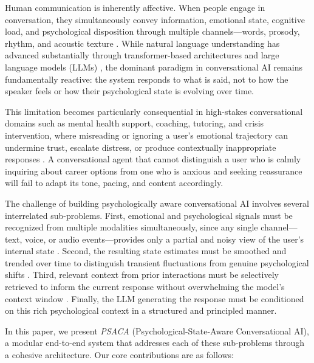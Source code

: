 \documentclass[conference]{IEEEtran}
\begin{document}
Human communication is inherently affective. When people engage in conversation, they simultaneously convey information, emotional state, cognitive load, and psychological disposition through multiple channels---words, prosody, rhythm, and acoustic texture \cite{picard2000affective, schuller2018age}. While natural language understanding has advanced substantially through transformer-based architectures and large language models (LLMs) \cite{brown2020language, openai2023gpt4}, the dominant paradigm in conversational AI remains fundamentally reactive: the system responds to what is said, not to how the speaker feels or how their psychological state is evolving over time.

This limitation becomes particularly consequential in high-stakes conversational domains such as mental health support, coaching, tutoring, and crisis intervention, where misreading or ignoring a user's emotional trajectory can undermine trust, escalate distress, or produce contextually inappropriate responses \cite{morris2018towards, fitzpatrick2017delivering}. A conversational agent that cannot distinguish a user who is calmly inquiring about career options from one who is anxious and seeking reassurance will fail to adapt its tone, pacing, and content accordingly.

The challenge of building psychologically aware conversational AI involves several interrelated sub-problems. First, emotional and psychological signals must be recognized from multiple modalities simultaneously, since any single channel---text, voice, or audio events---provides only a partial and noisy view of the user's internal state \cite{poria2017review, sebe2005multimodal}. Second, the resulting state estimates must be smoothed and trended over time to distinguish transient fluctuations from genuine psychological shifts \cite{cowie2001emotion}. Third, relevant context from prior interactions must be selectively retrieved to inform the current response without overwhelming the model's context window \cite{zhong2022dialoglm}. Finally, the LLM generating the response must be conditioned on this rich psychological context in a structured and principled manner.

In this paper, we present \textit{PSACA} (Psychological-State-Aware Conversational AI), a modular end-to-end system that addresses each of these sub-problems through a cohesive architecture. Our core contributions are as follows:
\end{document}
